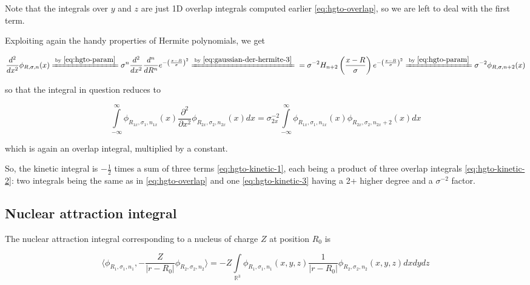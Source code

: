 \documentclass{article}
\newcommand{\equalby}[1]{\xlongequal{\text{by }\eqref{#1}}}
\begin{document}
\begin{appendices}
Note that the integrals over \begin{math}y\end{math} and \begin{math}z\end{math} are just 1D overlap integrals computed earlier \eqref{eq:hgto-overlap}, so we are left to deal with the first term.

Exploiting again the handy properties of Hermite polynomials, we get

\begin{equation}
\frac{d^2}{dx^2}\phi_{R,\sigma,n}(x) \equalby{eq:hgto-param} \sigma^n\frac{d^2}{dx^2}\frac{d^n}{dR^n}e^{-\left(\frac{x-R}{\sigma}\right)^2} \equalby{eq:gaussian-der-hermite-3} \\
= \sigma^{-2} H_{n+2}\left(\frac{x-R}{\sigma}\right) e^{-\left(\frac{x-R}{\sigma}\right)^2} \equalby{eq:hgto-param} \sigma^{-2}\phi_{R,\sigma,n+2}(x)
\end{equation}

so that the integral in question reduces to

\begin{equation} \label{eq:hgto-kinetic-3}
\int\limits_{-\infty}^\infty \phi_{R_{1x},\sigma_1,n_{1x}}(x)\frac{\partial^2}{\partial x^2}\phi_{R_{2x},\sigma_2,n_{2x}}(x) dx = \sigma_{2x}^{-2} \int\limits_{-\infty}^\infty \phi_{R_{1x},\sigma_1,n_{1x}}(x)\phi_{R_{2x},\sigma_2,n_{2x}+2}(x) dx
\end{equation}

which is again an overlap integral, multiplied by a constant.

So, the kinetic integral is \begin{math}-\frac{1}{2}\end{math} times a sum of three terms \eqref{eq:hgto-kinetic-1}, each being a product of three overlap integrals \eqref{eq:hgto-kinetic-2}: two integrals being the same as in \eqref{eq:hgto-overlap} and one \eqref{eq:hgto-kinetic-3} having a 2+ higher degree and a \begin{math}\sigma^{-2}\end{math} factor.

\subsection{Nuclear attraction integral}

The nuclear attraction integral corresponding to a nucleus of charge \(Z\) at position \(R_0\) is

\begin{equation} \label{eq:hgto-nuc-attr-1}
\langle \phi_{R_1,\sigma_1,n_1}, -\frac{Z}{|r-R_0|}\phi_{R_2,\sigma_2,n_2} \rangle = -Z \int\limits_{\mathbb{R}^3} \phi_{R_1,\sigma_1,n_1}(x,y,z) \frac{1}{|r-R_0|}\phi_{R_2,\sigma_2,n_2}(x,y,z) dxdydz 
\end{equation}


\end{appendices}
\end{document}
